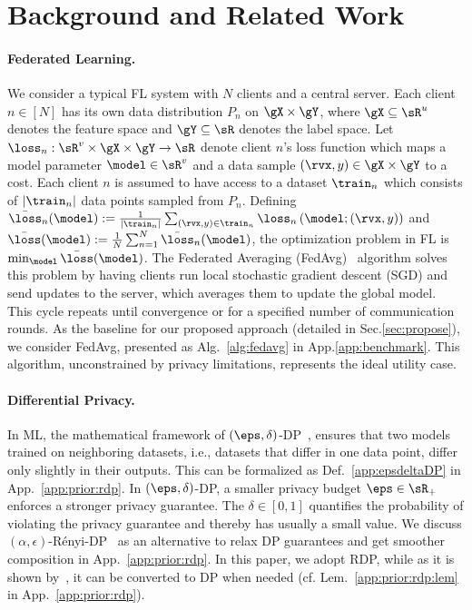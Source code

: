 \section{Background and Related Work}
\label{sec:back}

\paragraph{Federated Learning.}
We consider a typical FL system with $N$ clients and a central server. Each client $n \in [N]$ has its own data distribution $P_n$ on $\gX\times\gY$, where $\gX \subseteq \sR^u$ denotes the feature space and $\gY\subseteq \sR$ denotes the label space. Let $\loss_n:\sR^v \times \gX\times\gY \rightarrow \sR$ denote client $n$'s loss function which maps a model parameter $\model\in \sR^v$ and a data sample $(\rvx,y)\in \gX\times\gY$ to a cost. 
Each client $n$ is assumed to have access to a dataset $\train_n$ which consists of $\left|\train_n\right|$ data points sampled from $P_n$. Defining $\bar{\loss}_n(\model):= \frac{1}{\left| \train_n\right|}\sum_{(\rvx,y)\in \train_n} \loss_n\left(\model;(\rvx,y) \right)$ and $\bar{\loss}(\model) := \frac{1}{N} \sum_{n=1}^N \bar{\loss}_n(\model)$, the optimization problem in FL is $\min_{\model} \bar{\loss}(\model)$. The Federated Averaging (FedAvg)~\citep{mcmahan2017communication} algorithm solves this problem by having clients run local stochastic gradient descent (SGD) and send updates to the server, which averages them to update the global model. This cycle repeats until convergence or for a specified number of communication rounds. %
{As the baseline for our proposed approach (detailed in Sec.\ref{sec:propose}), we consider FedAvg, presented as Alg.~\ref{alg:fedavg} in App.\ref{app:benchmark}. This algorithm, unconstrained by privacy limitations, represents the ideal utility case.}


\paragraph{Differential Privacy.}
In ML, the mathematical framework of $(\eps,\delta)$-DP~\citep{dwork2014algorithmic}, ensures that two models trained on neighboring datasets, i.e., datasets that differ in one data point, differ only slightly in their outputs. %
{This can be formalized as Def.~\ref{app:epsdeltaDP} in App.~\ref{app:prior:rdp}.} 
In $(\eps,\delta)$-DP, a smaller privacy budget $\eps \in \sR_{+}$ enforces a stronger privacy guarantee. The $\delta\in [0,1]$ quantifies the probability of violating the privacy guarantee and thereby has usually a small value. 
We discuss $(\alpha, \epsilon)$-Rényi-DP~\citep{mironov2017renyi} as an alternative to relax DP guarantees and get smoother composition in App.~\ref{app:prior:rdp}. In this paper, we adopt RDP, while as it is shown by~\citep{mironov2017renyi}, it can be converted to DP when needed (cf. Lem.~\ref{app:prior:rdp:lem} in App.~\ref{app:prior:rdp}). 


